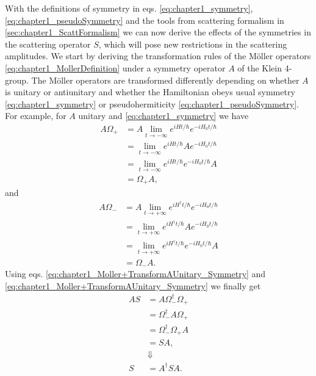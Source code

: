 With the definitions of symmetry in eqs. \eqref{eq:chapter1_symmetry}, \eqref{eq:chapter1_pseudoSymmetry} and the tools from scattering formalism in \ref{sec:chapter1_ScattFormalism} we can now derive the effects of the symmetries in the scattering operator $S$, which will pose new restrictions in the scattering amplitudes. We start by deriving the transformation rules of the M\"{o}ller operators \eqref{eq:chapter1_MollerDefinition} under a symmetry operator $A$ of the Klein 4-group. The M\"{o}ller operators are transformed differently depending on whether $A$ is unitary or antiunitary and whether the Hamiltonian obeys usual symmetry \eqref{eq:chapter1_symmetry} or pseudohermiticity \eqref{eq:chapter1_pseudoSymmetry}. For example, for $A$ unitary and \eqref{eq:chapter1_symmetry} we have
%
\begin{equation}
  \begin{split}
    A \Omega_+ &= A \lim_{t \to -\infty} e^{i H t/\hbar}e^{-i H_0 t/\hbar}\\
    &= \lim_{t \to -\infty}e^{i H t/\hbar}Ae^{-i H_0 t/\hbar}\\
    &= \lim_{t \to -\infty} e^{i H t/\hbar}e^{-i H_0 t/\hbar}A\\
    &= \Omega_+ A,
  \end{split}
  \label{eq:chapter1_Moller+TransformAUnitary_Symmetry}
\end{equation}
%
and
%
\begin{equation}
  \begin{split}
    A \Omega_- &= A \lim_{t \to +\infty} e^{i H^\dagger t/\hbar}e^{-i H_0 t/\hbar}\\
    &= \lim_{t \to +\infty}e^{i H^\dagger t/\hbar}Ae^{-i H_0 t/\hbar}\\
    &= \lim_{t \to +\infty} e^{i H^\dagger t/\hbar}e^{-i H_0 t/\hbar}A\\
    &= \Omega_- A.
  \end{split}
  \label{eq:chapter1_Moller-TransformAUnitary_Symmetry}
\end{equation}
%
Using eqs. \eqref{eq:chapter1_Moller+TransformAUnitary_Symmetry} and \eqref{eq:chapter1_Moller+TransformAUnitary_Symmetry} we finally get
%
\begin{equation}
  \begin{split}
    A S &= A \Omega_{-}^\dagger\Omega_{+} \\
    &= \Omega_{-}^\dagger A \Omega_{+} \\
    &= \Omega_{-}^\dagger\Omega_{+} A \\
    &= S A,\\
    &\Downarrow\\
    S &= A^{\dagger}SA.
  \end{split}
  \label{eq:chapter1_Moller-TransformAUnitary_Symmetry}
\end{equation}
